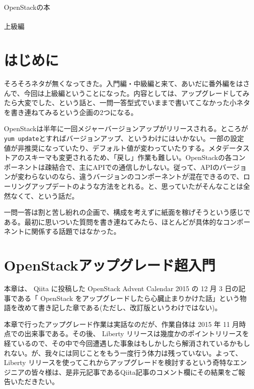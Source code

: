 \documentclass[9pt,b5paper,tombo,openany]{jsbook}
\begin{document}
\noindent
{\Huge OpenStackの本\\ \\上級編}

\vspace*{-5mm}
\begin{minipage}{0.4\paperwidth}
	\tableofcontents
\end{minipage}
\thispagestyle{empty}

\chapter{はじめに}

\setcounter{page}{1}

そろそろネタが無くなってきた。入門編・中級編と来て、あいだに番外編をはさんで、今回は上級編ということになった。内容としては、アップグレードしてみたら大変でした、という話と、一問一答型式でいままで書いてこなかった小ネタを書き連ねてみるという企画の2つになる。

OpenStackは半年に一回メジャーバージョンアップがリリースされる。ところが\verb|yum update|とすればバージョンアップ、というわけにはいかない。一部の設定値が非推奨になっていたり、デフォルト値が変わっていたりする。メタデータストアのスキーマも変更されるため、「戻し」作業も難しい。OpenStackの各コンポーネントは疎結合で、主にAPIでの通信しかしない。従って、APIのバージョンが変わらないのなら、違うバージョンのコンポーネントが混在できるので、ローリングアップデートのような方法をとれる。と、思っていたがそんなことは全然なくて、という話だ。

一問一答は割と苦し紛れの企画で、構成を考えずに紙面を稼げそうという感じである。最初に思いついた質問を書き連ねてみたら、ほとんどが具体的なコンポーネントに関係する話題ではなかった。

\chapter{OpenStackアップグレード超入門}

本章は、 Qiita に投稿した OpenStack Advent Calendar 2015 の 12 月 3 日の記事である「 OpenStack をアップグレードしたら心臓止まりかけた話」という物語を改めて書き記した章である(ただし、改訂版というわけではない)。

本章で行ったアップグレード作業は実話なのだが、作業自体は 2015 年 11 月時点での出来事である。その後、 Liberty リリースは幾度かのポイントリリースを経ているので、その中で今回遭遇した事象はもしかしたら解消されているかもしれない。が、我々には同じことをもう一度行う体力は残っていない。よって、 Liberty リリースを使ってこれからアップグレードを検討するという奇特なエンジニアの皆々様は、是非元記事であるQiita記事のコメント欄にその結果をご報告いただきたい。
\end{document}
